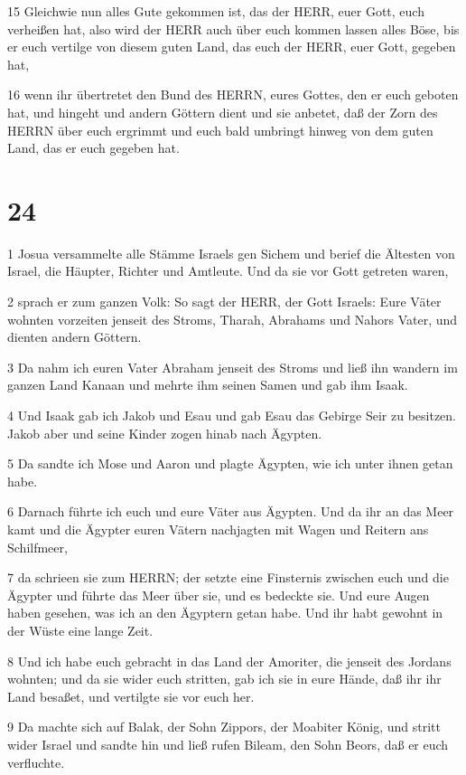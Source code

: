 \par 15 Gleichwie nun alles Gute gekommen ist, das der HERR, euer Gott, euch verheißen hat, also wird der HERR auch über euch kommen lassen alles Böse, bis er euch vertilge von diesem guten Land, das euch der HERR, euer Gott, gegeben hat,
\par 16 wenn ihr übertretet den Bund des HERRN, eures Gottes, den er euch geboten hat, und hingeht und andern Göttern dient und sie anbetet, daß der Zorn des HERRN über euch ergrimmt und euch bald umbringt hinweg von dem guten Land, das er euch gegeben hat.

\chapter{24}

\par 1 Josua versammelte alle Stämme Israels gen Sichem und berief die Ältesten von Israel, die Häupter, Richter und Amtleute. Und da sie vor Gott getreten waren,
\par 2 sprach er zum ganzen Volk: So sagt der HERR, der Gott Israels: Eure Väter wohnten vorzeiten jenseit des Stroms, Tharah, Abrahams und Nahors Vater, und dienten andern Göttern.
\par 3 Da nahm ich euren Vater Abraham jenseit des Stroms und ließ ihn wandern im ganzen Land Kanaan und mehrte ihm seinen Samen und gab ihm Isaak.
\par 4 Und Isaak gab ich Jakob und Esau und gab Esau das Gebirge Seir zu besitzen. Jakob aber und seine Kinder zogen hinab nach Ägypten.
\par 5 Da sandte ich Mose und Aaron und plagte Ägypten, wie ich unter ihnen getan habe.
\par 6 Darnach führte ich euch und eure Väter aus Ägypten. Und da ihr an das Meer kamt und die Ägypter euren Vätern nachjagten mit Wagen und Reitern ans Schilfmeer,
\par 7 da schrieen sie zum HERRN; der setzte eine Finsternis zwischen euch und die Ägypter und führte das Meer über sie, und es bedeckte sie. Und eure Augen haben gesehen, was ich an den Ägyptern getan habe. Und ihr habt gewohnt in der Wüste eine lange Zeit.
\par 8 Und ich habe euch gebracht in das Land der Amoriter, die jenseit des Jordans wohnten; und da sie wider euch stritten, gab ich sie in eure Hände, daß ihr ihr Land besaßet, und vertilgte sie vor euch her.
\par 9 Da machte sich auf Balak, der Sohn Zippors, der Moabiter König, und stritt wider Israel und sandte hin und ließ rufen Bileam, den Sohn Beors, daß er euch verfluchte.
